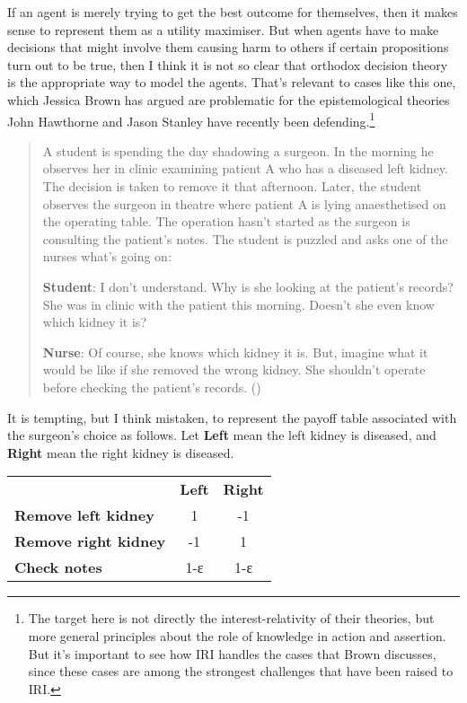 \documentclass[
  11pt,
  letterpaper,
  DIV=11,
  numbers=noendperiod,
  twoside]{scrartcl}
\begin{document}
If an agent is merely trying to get the best outcome for themselves,
then it makes sense to represent them as a utility maximiser. But when
agents have to make decisions that might involve them causing harm to
others if certain propositions turn out to be true, then I think it is
not so clear that orthodox decision theory is the appropriate way to
model the agents. That's relevant to cases like this one, which Jessica
Brown has argued are problematic for the epistemological theories John
Hawthorne and Jason Stanley have recently been defending.\footnote{The
  target here is not directly the interest-relativity of their theories,
  but more general principles about the role of knowledge in action and
  assertion. But it's important to see how IRI handles the cases that
  Brown discusses, since these cases are among the strongest challenges
  that have been raised to IRI.}

\begin{quote}
A student is spending the day shadowing a surgeon. In the morning he
observes her in clinic examining patient A who has a diseased left
kidney. The decision is taken to remove it that afternoon. Later, the
student observes the surgeon in theatre where patient A is lying
anaesthetised on the operating table. The operation hasn't started as
the surgeon is consulting the patient's notes. The student is puzzled
and asks one of the nurses what's going on:

\textbf{Student}: I don't understand. Why is she looking at the
patient's records? She was in clinic with the patient this morning.
Doesn't she even know which kidney it is?

\textbf{Nurse}: Of course, she knows which kidney it is. But, imagine
what it would be like if she removed the wrong kidney. She shouldn't
operate before checking the patient's records.
()
\end{quote}

It is tempting, but I think mistaken, to represent the payoff table
associated with the surgeon's choice as follows. Let \textbf{Left} mean
the left kidney is diseased, and \textbf{Right} mean the right kidney is
diseased.

\begin{longtable}[]{@{}lcc@{}}
\toprule\noalign{}
\endhead
\bottomrule\noalign{}
\endlastfoot
& \textbf{Left} & \textbf{Right} \\
\textbf{Remove left kidney} & 1 & -1 \\
\textbf{Remove right kidney} & -1 & 1 \\
\textbf{Check notes} & 1-ε & 1-ε \\
\end{longtable}
\end{document}
